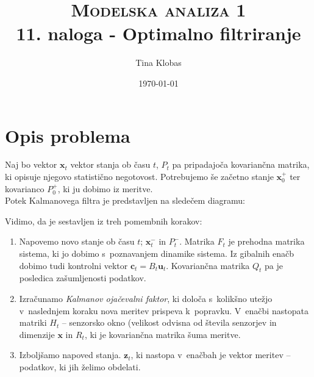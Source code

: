 \documentclass[a4paper,pdftex,10pt]{article}
\title{	
\normalfont \normalsize 
\textsc{Modelska analiza 1} \\ [25pt] %
\huge 11. naloga - Optimalno filtriranje\\ %
}
\author{Tina Klobas} %
\date{\normalsize\today} %
\renewcommand{\vec}[1]{\boldsymbol{\mathbf{#1}}}
\numberwithin{figure}{section} %
\begin{document}
\maketitle %

\section{Opis problema}
Naj bo vektor $\vec{x}_t$ vektor stanja ob času $t$, $P_t$ pa pripadajoča kovariančna
matrika, ki opisuje njegovo statistično negotovost. Potrebujemo še začetno stanje 
$\vec{x}_0^+$ ter kovarianco $P_0^+$, ki ju dobimo iz meritve. \\
Potek Kalmanovega filtra je predstavljen na sledečem diagramu:
\begin{figure}[H]
  \centering
\end{figure}

Vidimo, da je sestavljen iz treh pomembnih korakov:
\begin{enumerate}
    \item Napovemo novo stanje ob času $t$; $\vec{x}_{t}^-$ in $P_{t}^-$. Matrika $F_t$ je
	prehodna matrika sistema, ki jo dobimo s~poznavanjem dinamike sistema. 
	Iz gibalnih enačb dobimo tudi kontrolni vektor $\vec{c}_t = B_t \vec{u}_t$. 
	Kovariančna matrika $Q_t$ pa je posledica zašumljenosti podatkov.
    \item Izračunamo \emph{Kalmanov ojačevalni faktor}, ki določa s~kolikšno utežjo
	v~naslednjem koraku nova meritev prispeva k~popravku. V~enačbi nastopata matriki
	$H_t$ -- senzorsko okno (velikost odvisna od števila senzorjev in dimenzije 
	$\vec{x}$ in $R_t$, ki je kovariančna matrika šuma meritve.
    \item Izboljšamo napoved stanja. $\vec{z}_t$, ki nastopa v~enačbah je vektor meritev
	-- podatkov, ki jih želimo obdelati.
\end{enumerate}
\end{document}
